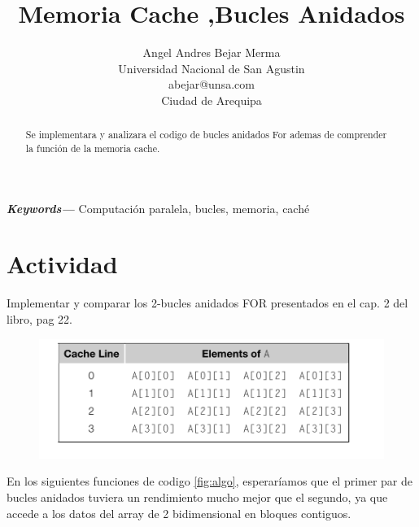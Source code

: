 \documentclass[12pt]{article}
\title{Memoria Cache ,Bucles Anidados }
\author{Angel Andres Bejar Merma\\
  \small Universidad Nacional de San Agustin\\
  \small abejar@unsa.com\\
  \small Ciudad de Arequipa
}
\providecommand{\keywords}[1]
{
  \small	
  \textbf{\textit{Keywords---}} #1
}
\begin{document}
%

%


\maketitle

\begin{abstract}
    Se implementara y analizara el codigo de  bucles anidados  For ademas de comprender la función de  la memoria cache.
    \end{abstract}
    
    \keywords{Computación paralela, bucles, memoria, caché}%







\section{Actividad}

Implementar y comparar los 2-bucles anidados FOR presentados en el cap. 2 del libro, pag 22.



\begin{figure}[H]%
  \centering
  \includegraphics[width=15cm]{imagenes/Captura de pantalla de 2023-09-18 00-32-30.png}
 
  
  \end{figure}
  

  En los siguientes funciones de codigo \ref{fig:algo}, esperaríamos que el primer par de bucles anidados tuviera un rendimiento mucho mejor que el segundo, ya que accede a los datos del array  de 2 bidimensional en bloques contiguos.
\end{document}
